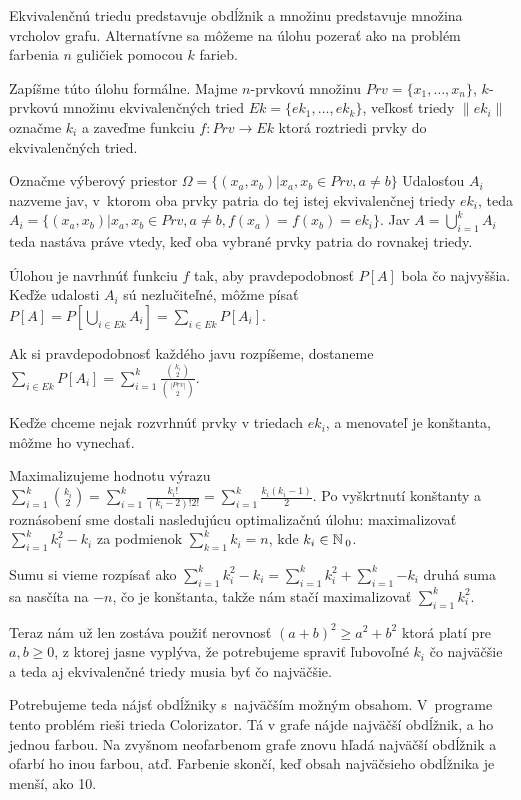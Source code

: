 \begin{note}
Ekvivalenčnú triedu predstavuje obdĺžnik a množinu predstavuje množina vrcholov grafu.
Alternatívne sa môžeme na úlohu pozerať ako na problém farbenia $n$ guličiek pomocou $k$ farieb.
\end{note}

Zapíšme túto úlohu formálne. Majme $n$-prvkovú množinu $Prv = \{x_1,\ldots,x_n\}$, $k$-prvkovú množinu ekvivalenčných tried $Ek = \{ek_1,\ldots, ek_k\}$, veľkosť 
triedy $\|ek_i\|$ označme $k_i$ a zaveďme funkciu $f \colon Prv \to Ek$ ktorá roztriedi prvky do ekvivalenčných tried.

Označme výberový priestor $\Omega = \{(x_a, x_b) | x_a, x_b \in Prv, a \not= b \}$
Udalosťou $A_i$ nazveme jav, v~ktorom oba prvky patria do tej istej ekvivalenčnej triedy $ek_i$,
teda $A_i = \{(x_a, x_b) | x_a, x_b \in Prv, a \not= b, f(x_a) = f(x_b) = ek_i \}$.
Jav $A = \bigcup_{i=1}^{k} A_i$ teda nastáva práve vtedy,
 keď oba vybrané prvky patria do rovnakej triedy.

Úlohou je navrhnúť funkciu $f$ tak, aby pravdepodobnosť $P[A]$ bola čo najvyššia. 
Keďže udalosti $A_i$ sú nezlučiteľné, môžme písať 
$P[A] = P[\bigcup_{i \in Ek} A_i] = \sum_{i \in Ek}P[A_i]$.

Ak si pravdepodobnosť každého javu rozpíšeme, dostaneme 
$\sum_{i \in Ek}P[A_i] = \sum_{i = 1}^{k} \frac{{{k_i} \choose {2}}}{{{|Prv|} \choose {2}}}$.


Keďže chceme nejak rozvrhnúť prvky v triedach $ek_i$, a menovateľ je konštanta, môžme ho vynechať.

Maximalizujeme hodnotu výrazu 
$\sum_{i = 1}^{k} {{k_i} \choose {2}} = \sum_{i = 1}^{k} {\frac{k_i!}{(k_i -2 )!2!}} = \sum_{i = 1}^{k}{\frac{k_i (k_i-1)}{2}}$.
Po vyškrtnutí konštanty a roznásobení sme dostali nasledujúcu optimalizačnú úlohu:
maximalizovať $\sum_{i = 1}^{k} {k_i^2 - k_i}$ za podmienok $\sum_{k=1}^{k}k_i = n$,
kde $k_i \in \mathbb{N}\,_0$.

Sumu si vieme rozpísať ako 
$\sum_{i = 1}^{k} {k_i^2 - k_i} = \sum_{i = 1}^{k} {k_i^2} + \sum_{i = 1}^{k}{-k_i}$
druhá suma sa nasčíta na $-n$, čo je konštanta, takže nám stačí maximalizovať 
$\sum_{i = 1}^{k} {k_i^2}$.

Teraz nám už len zostáva použiť nerovnosť
$(a+b)^2 \geq a^2 + b^2$ ktorá platí pre $a,b \geq 0$, z ktorej jasne vyplýva, že potrebujeme spraviť ľubovoľné $k_i$ čo najväčšie
a teda aj ekvivalenčné triedy musia byť čo najväčšie.

Potrebujeme teda nájsť obdĺžniky s~najväčším možným obsahom. 
V~programe tento problém rieši trieda Colorizator.
Tá v grafe nájde najväčší obdĺžnik, a  ho jednou farbou.
Na zvyšnom neofarbenom grafe znovu hľadá najväčší obdĺžnik a ofarbí ho inou farbou, atď.
Farbenie skončí, keď obsah najväčsieho obdĺžnika je menší, ako 10.


